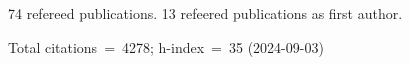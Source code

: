 74 refereed publications. 13 refeered publications as first author.

Total citations~=~4278; h-index~=~35 (2024-09-03)